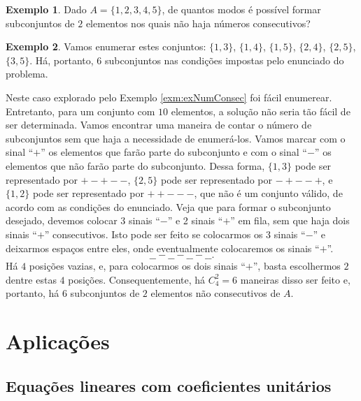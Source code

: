 \documentclass[]{book}
\theoremstyle{definition}
\theoremstyle{definition}
\newtheorem{example}{Exemplo}[chapter]
\theoremstyle{definition}
\theoremstyle{remark}
\begin{document}
\begin{example}
\protect\hypertarget{exm:unnamed-chunk-59}{}{\label{exm:unnamed-chunk-59} }Dado \(A = \{1,2,3,4,5\}\), de quantos modos é possível formar subconjuntos de \(2\) elementos nos quais não haja números consecutivos?
\end{example}

\begin{example}
\protect\hypertarget{exm:exNumConsec}{}{\label{exm:exNumConsec} }Vamos enumerar estes conjuntos: \(\{1,3\}\), \(\{1,4\}\), \(\{1,5\}\), \(\{2,4\}\), \(\{2,5\}\), \(\{3,5\}\).
Há, portanto, \(6\) subconjuntos nas condições impostas pelo enunciado do problema.
\end{example}

Neste caso explorado pelo Exemplo \ref{exm:exNumConsec} foi fácil enumerear.
Entretanto, para um conjunto com \(10\) elementos, a solução não seria tão fácil de ser determinada.
Vamos encontrar uma maneira de contar o número de subconjuntos sem que haja a necessidade de enumerá-los.
Vamos marcar com o sinal ``\(+\)'' os elementos que farão parte do subconjunto e com o sinal ``\(-\)'' os elementos que não farão parte do subconjunto.
Dessa forma, \(\{1,3\}\) pode ser representado por \(+-+--\), \(\{2,5\}\) pode ser representado por \(-+--+\), e \(\{1,2\}\) pode ser representado por \(++---\), que não é um conjunto válido, de acordo com as condições do enunciado.
Veja que para formar o subconjunto desejado, devemos colocar 3 sinais ``\(-\)'' e 2 sinais ``\(+\)'' em fila, sem que haja dois sinais ``\(+\)'' consecutivos.
Isto pode ser feito se colocarmos os \(3\) sinais ``\(-\)'' e deixarmos espaços entre eles, onde eventualmente colocaremos os sinais ``\(+\)''.
\[\_\_ - \_\_ - \_\_ - \_\_ .\]
Há \(4\) posições vazias, e, para colocarmos os dois sinais ``\(+\)'', basta escolhermos \(2\) dentre estas \(4\) posições.
Consequentemente, há \(C^2_4=6\) maneiras disso ser feito e, portanto, há \(6\) subconjuntos de \(2\) elementos não consecutivos de \(A\).

\hypertarget{aplicauxe7uxf5es}{%
\section{Aplicações}\label{aplicauxe7uxf5es}}

\hypertarget{equauxe7uxf5es-lineares-com-coeficientes-unituxe1rios}{%
\subsection{Equações lineares com coeficientes unitários}\label{equauxe7uxf5es-lineares-com-coeficientes-unituxe1rios}}
\end{document}
